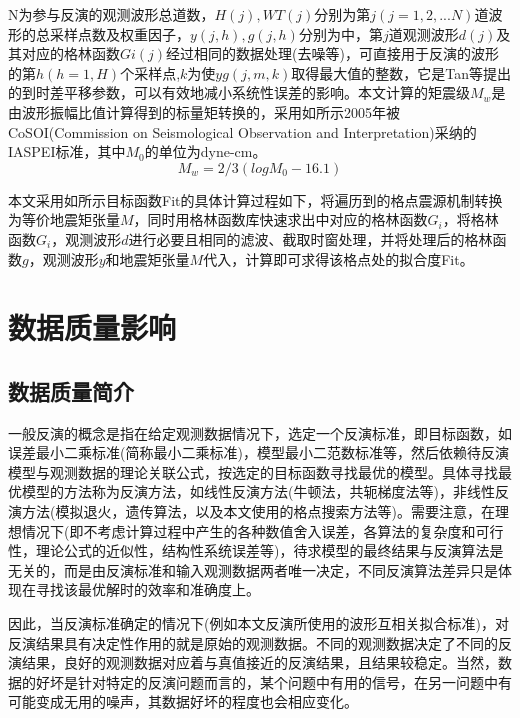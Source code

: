 N为参与反演的观测波形总道数，$H(j),WT(j)$分别为第$j(j=1,2,...N)$道波形的总采样点数及权重因子，$y(j,h),g(j,h)$分别为中，第$j$道观测波形$d(j)$及其对应的格林函数$Gi(j)$经过相同的数据处理(去噪等)，可直接用于反演的波形的第$h(h=1,H)$个采样点,$k$为使$yg(j,m,k)$取得最大值的整数，它是Tan等\citep{Tan2006}提出的到时差平移参数，可以有效地减小系统性误差的影响。本文计算的矩震级$M_w$是由波形振幅比值计算得到的标量矩转换的，采用如所示2005年被CoSOI(Commission on Seismological Observation and Interpretation)采纳的IASPEI标准，其中$M_0$的单位为dyne-cm。
\begin{equation}
\label{eq2_16}
	M_w=2/3(logM_0-16.1)
\end{equation}

本文采用如所示目标函数Fit的具体计算过程如下，将遍历到的格点震源机制转换为等价地震矩张量$M$\citep{Jost1989}，同时用格林函数库快速求出中对应的格林函数$G_i$，将格林函数$G_i$，观测波形$d$进行必要且相同的滤波、截取时窗处理，并将处理后的格林函数$g$，观测波形$y$和地震矩张量$M$代入，计算即可求得该格点处的拟合度Fit。


\section{数据质量影响}

\subsection{数据质量简介}

一般反演的概念是指在给定观测数据情况下，选定一个反演标准，即目标函数，如误差最小二乘标准(简称最小二乘标准)，模型最小二范数标准等，然后依赖待反演模型与观测数据的理论关联公式，按选定的目标函数寻找最优的模型。具体寻找最优模型的方法称为反演方法，如线性反演方法(牛顿法，共轭梯度法等)，非线性反演方法(模拟退火，遗传算法，以及本文使用的格点搜索方法等)。需要注意，在理想情况下(即不考虑计算过程中产生的各种数值舍入误差，各算法的复杂度和可行性，理论公式的近似性，结构性系统误差等)，待求模型的最终结果与反演算法是无关的，而是由反演标准和输入观测数据两者唯一决定，不同反演算法差异只是体现在寻找该最优解时的效率和准确度上。

因此，当反演标准确定的情况下(例如本文反演所使用的波形互相关拟合标准)，对反演结果具有决定性作用的就是原始的观测数据。不同的观测数据决定了不同的反演结果，良好的观测数据对应着与真值接近的反演结果，且结果较稳定。当然，数据的好坏是针对特定的反演问题而言的，某个问题中有用的信号，在另一问题中有可能变成无用的噪声，其数据好坏的程度也会相应变化。

